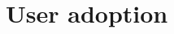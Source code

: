 \documentclass[11pt]{article}
\newcommand{\smalltodo}[2][]
    {\todo[caption={#2}, #1]
    {\tiny#2\normalsize}}
\begin{document}





\section{User adoption}

\end{document}
